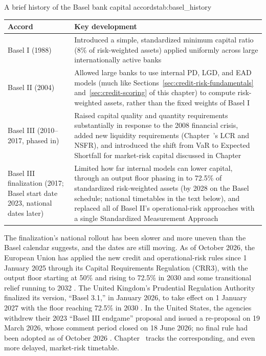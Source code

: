 \documentclass[../ai_in_finance]{subfiles}
\begin{document}
\begin{booktable}[htbp]{A brief history of the Basel bank capital accords}{tab:basel_history}
\begin{tabular}{L{2.2cm}L{9.8cm}}
\toprule
Accord & Key development \\
\midrule
Basel I (1988) & Introduced a simple, standardized minimum capital ratio (8\% of risk-weighted assets) applied uniformly across large internationally active banks \\
Basel II (2004) & Allowed large banks to use internal PD, LGD, and EAD models (much like Sections~\ref{sec:credit-risk-fundamentals} and~\ref{sec:credit-scoring} of this chapter) to compute risk-weighted assets, rather than the fixed weights of Basel I \\
Basel III (2010--2017, phased in) & Raised capital quality and quantity requirements substantially in response to the 2008 financial crisis, added new liquidity requirements (Chapter~'s LCR and NSFR), and introduced the shift from VaR to Expected Shortfall for market-risk capital discussed in Chapter~ \\
Basel III finalization (2017; Basel start date 2023, national dates later) & Limited how far internal models can lower capital, through an output floor phasing in to 72.5\% of standardized risk-weighted assets (by 2028 on the Basel schedule; national timetables in the text below), and replaced all of Basel II's operational-risk approaches with a single Standardized Measurement Approach \\
\bottomrule
\end{tabular}
\end{booktable}

The finalization's national rollout has been slower and more uneven than the Basel calendar suggests, and the dates are still moving. As of October 2026, the European Union has applied the new credit and operational-risk rules since 1 January 2025 through its Capital Requirements Regulation (CRR3), with the output floor starting at 50\% and rising to 72.5\% in 2030 and some transitional relief running to 2032 \parencite{eu2024crr3}. The United Kingdom's Prudential Regulation Authority finalized its version, ``Basel 3.1,'' in January 2026, to take effect on 1 January 2027 with the floor reaching 72.5\% in 2030 \parencite{pra2026ps126}. In the United States, the agencies withdrew their 2023 ``Basel III endgame'' proposal and issued a re-proposal on 19 March 2026, whose comment period closed on 18 June 2026; no final rule had been adopted as of October 2026 \parencite{fed2026capital}. Chapter~ tracks the corresponding, and even more delayed, market-risk timetable.
\end{document}
